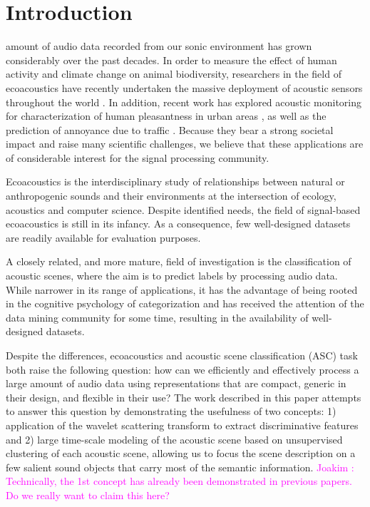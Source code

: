 \documentclass[journal]{IEEEtran}
\newcommand{\ja}[1]{\textcolor{magenta}{Joakim : #1}}
\begin{document}
\section{Introduction}

 amount of audio data recorded from our sonic environment has grown considerably over the past decades.
In order to measure the effect of human activity and climate change on animal biodiversity, researchers in the field of ecoacoustics \cite{krause} have recently undertaken the massive deployment of acoustic sensors throughout the world \cite{warren2006urban, NessSST13, stowell13b}. 
In addition, recent work has explored acoustic monitoring for characterization of human pleasantness in urban areas \cite{guyot2005urban, ricciardi2015sound}, as well as the prediction of annoyance due to traffic \cite{gloaguen}.
Because they bear a strong societal impact and raise many scientific challenges, we believe that these applications are of considerable interest for the signal processing community.

Ecoacoustics is the interdisciplinary study of relationships between natural or anthropogenic sounds and their environments at the intersection of ecology, acoustics and computer science. Despite identified needs, the field of signal-based ecoacoustics is still in its infancy.
As a consequence, few well-designed datasets are readily available for evaluation purposes.

A closely related, and more mature, field of investigation is the classification of acoustic scenes, where the aim is to predict labels by processing audio data.
While narrower in its range of applications, it has the advantage of being rooted in the cognitive psychology of categorization \cite{dubois2006cognitive, guastavino_ideal_2006} and has received the attention of the data mining community for some time, resulting in the availability of well-designed datasets.

Despite the differences, ecoacoustics and acoustic scene classification (ASC) task both raise the following question: how can we efficiently and effectively process a large amount of audio data using representations that are compact, generic in their design, and flexible in their use?
The work described in this paper attempts to answer this question by demonstrating the usefulness of two concepts: 1) application of the wavelet scattering transform to extract discriminative features and 2) large time-scale modeling of the acoustic scene based on unsupervised clustering of each acoustic scene, allowing us to focus the scene description on a few salient sound objects that carry most of the semantic information. \ja{Technically, the 1st concept has already been demonstrated in previous papers. Do we really want to claim this here?}
\end{document}
